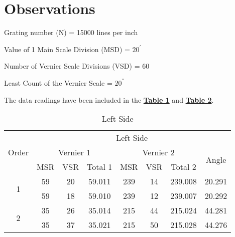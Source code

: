 
\section{Observations}

	Grating number (N) = 15000 lines per inch

	Value of 1 Main Scale Division (MSD) = $20^{'}$

	Number of Vernier Scale Divisions (VSD) = $60$

	Least Count of the Vernier Scale = $ 20^{''}$

	\vspace{3mm}
	The data readings have been included in the \hyperref[table:l]{\textbf{Table 1}} and \hyperref[table:r]{\textbf{Table 2}}.


\begin{table}[ht]
	\centering
	\begin{tabular}{|c|ccccccc|}
		\hline
		\multirow{3}{*}{Order}           &
		\multicolumn{7}{c|}{Left   Side}   \\ \cline{2-8}
		                                 &
		\multicolumn{3}{c|}{Vernier   1} &
		\multicolumn{3}{c|}{Vernier 2}   &
		\multirow{2}{*}{Angle}          \\ \cline{2-7}
		                                 &
		\multicolumn{1}{c|}{MSR}         &
		\multicolumn{1}{c|}{VSR}         &
		\multicolumn{1}{c|}{Total 1}     &
		\multicolumn{1}{c|}{MSR}         &
		\multicolumn{1}{c|}{VSR}         &
		\multicolumn{1}{c|}{Total 2}     &
		\\ \hline
		\multirow{2}{*}{1}               &
		\multicolumn{1}{c|}{59}          &
		\multicolumn{1}{c|}{20}          &
		\multicolumn{1}{c|}{59.011}      &
		\multicolumn{1}{c|}{239}         &
		\multicolumn{1}{c|}{14}          &
		\multicolumn{1}{c|}{239.008}     &
		20.291                             \\ \cline{2-8}
		                                 &
		\multicolumn{1}{c|}{59}          &
		\multicolumn{1}{c|}{18}          &
		\multicolumn{1}{c|}{59.010}      &
		\multicolumn{1}{c|}{239}         &
		\multicolumn{1}{c|}{12}          &
		\multicolumn{1}{c|}{239.007}     &
		20.292                             \\ \hline
		\multirow{2}{*}{2}               &
		\multicolumn{1}{c|}{35}          &
		\multicolumn{1}{c|}{26}          &
		\multicolumn{1}{c|}{35.014}      &
		\multicolumn{1}{c|}{215}         &
		\multicolumn{1}{c|}{44}          &
		\multicolumn{1}{c|}{215.024}     &
		44.281                             \\ \cline{2-8}
		                                 &
		\multicolumn{1}{c|}{35}          &
		\multicolumn{1}{c|}{37}          &
		\multicolumn{1}{c|}{35.021}      &
		\multicolumn{1}{c|}{215}         &
		\multicolumn{1}{c|}{50}          &
		\multicolumn{1}{c|}{215.028}     &
		44.276                             \\ \hline
	\end{tabular}
	\caption{Left Side}
	\label{table:l}
\end{table}

